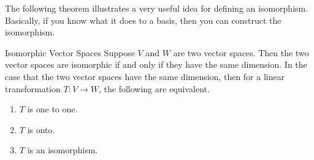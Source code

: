 The following theorem illustrates a very useful idea for defining an
isomorphism. Basically, if you know what it does to a basis, then you can
construct the isomorphism.

\begin{theorem}{Isomorphic Vector Spaces}\label{thm:isomorphicvectorspaces}
Suppose $V$ and $W$ are two vector spaces. Then the two vector spaces are isomorphic if and only
if they have the same dimension. In the case that the two vector spaces have
the same dimension, then for
 a linear transformation $T:V\rightarrow W$, the
following are equivalent.

\begin{enumerate}
\item $T$ is one to one.

\item $T$ is onto.

\item $T$ is an isomorphism.
\end{enumerate}
\end{theorem}

